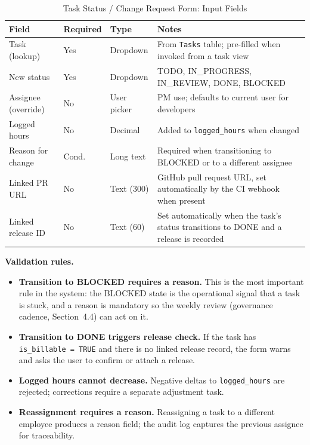 \documentclass[12pt,a4paper]{report}
\begin{document}
\begin{table}[H]
\centering
\caption{Task Status / Change Request Form: Input Fields}
\small
\renewcommand{\arraystretch}{1.30}
\setlength{\tabcolsep}{6pt}
\begin{tabularx}{\textwidth}{>{\raggedright\arraybackslash}p{3.6cm}
                                >{\raggedright\arraybackslash}p{1.6cm}
                                >{\raggedright\arraybackslash}p{2.4cm}
                                >{\raggedright\arraybackslash}X}
\toprule
\textbf{Field} & \textbf{Required} & \textbf{Type} & \textbf{Notes} \\
\midrule
Task (lookup)              & Yes & Dropdown    & From \texttt{Tasks} table; pre-filled when invoked from a task view \\
New status                 & Yes & Dropdown    & TODO, IN\_PROGRESS, IN\_REVIEW, DONE, BLOCKED \\
Assignee (override)        & No  & User picker & PM use; defaults to current user for developers \\
Logged hours               & No  & Decimal     & Added to \texttt{logged\_hours} when changed \\
Reason for change          & Cond. & Long text & Required when transitioning to BLOCKED or to a different assignee \\
Linked PR URL              & No  & Text (300)  & GitHub pull request URL, set automatically by the CI webhook when present \\
Linked release ID          & No  & Text (60)   & Set automatically when the task's status transitions to DONE and a release is recorded \\
\bottomrule
\end{tabularx}
\end{table}

\textbf{Validation rules.}
\begin{itemize}[leftmargin=1.6em]
    \item \textbf{Transition to BLOCKED requires a reason.} This is the most
          important rule in the system: the BLOCKED state is the operational
          signal that a task is stuck, and a reason is mandatory so the
          weekly review (governance cadence, Section~4.4) can act on it.
    \item \textbf{Transition to DONE triggers release check.} If the task
          has \texttt{is\_billable = TRUE} and there is no linked release
          record, the form warns and asks the user to confirm or attach a
          release.
    \item \textbf{Logged hours cannot decrease.} Negative deltas to
          \texttt{logged\_hours} are rejected; corrections require a
          separate adjustment task.
    \item \textbf{Reassignment requires a reason.} Reassigning a task to a
          different employee produces a reason field; the audit log captures
          the previous assignee for traceability.
\end{itemize}
\end{document}
